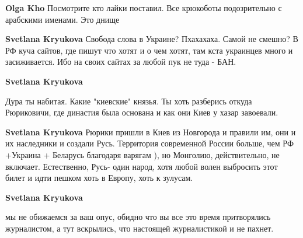 \begin{itemize}
\begin{itemize}
\textbf{Olga Kho} Посмотрите кто лайки поставил. Все крюкоботы подозрительно с арабскими именами. Это днище

 
\textbf{Svetlana Kryukova} Свобода слова в Украине? Пхахахаха. Самой не смешно?
В РФ куча сайтов, где пишут что хотят и о чем хотят, там кста украинцев много и засиживается. Ибо на своих сайтах за любой пук не туда - БАН.

 
\textbf{Svetlana Kryukova} 

Дура ты набитая. Какие "киевские" князья. Ты хоть разберись откуда Рюриковичи,
где династия была основана и как они Киев у хазар завоевали.

 
\textbf{Svetlana Kryukova} Рюрики пришли в Киев из Новгорода и правили им, они и их наследники и создали Русь. Территория современной России больше, чем РФ +Украина + Беларусь благодаря варягам ), но Монголию, действительно, не включает. Естественно, Русь- один народ, хотя любой волен выбросить этот билет и идти пешком хоть в Европу, хоть к зулусам.

 
\textbf{Svetlana Kryukova} 

мы не обижаемся за ваш опус, обидно что вы все это время притворялись журналистом, а тут вскрылись, что настоящей журналистикой и не пахнет.

 

\end{itemize}
\end{itemize}
